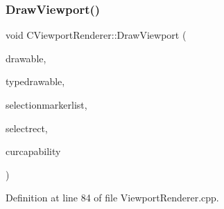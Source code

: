 \subsubsection{\texorpdfstring{Draw\+Viewport()}{DrawViewport()}}
{\footnotesize\ttfamily void C\+Viewport\+Renderer\+::\+Draw\+Viewport (\begin{DoxyParamCaption}\item[{Gdk\+Drawable $\ast$}]{drawable,  }\item[{Gdk\+Drawable $\ast$}]{typedrawable,  }\item[{const std\+::list$<$ std\+::weak\+\_\+ptr$<$ \hyperlink{classCPlayerAsset}{C\+Player\+Asset} $>$ $>$ \&}]{selectionmarkerlist,  }\item[{const \hyperlink{structSRectangle}{S\+Rectangle} \&}]{selectrect,  }\item[{\hyperlink{GameDataTypes_8h_a35b98ce26aca678b03c6f9f76e4778ce}{E\+Asset\+Capability\+Type}}]{curcapability }\end{DoxyParamCaption})}



Definition at line 84 of file Viewport\+Renderer.\+cpp.


